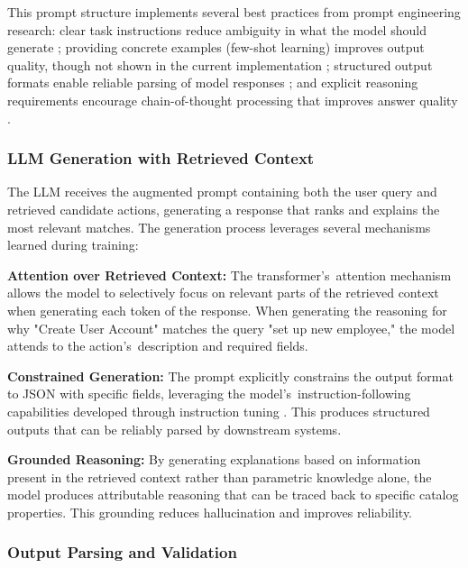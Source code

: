 This prompt structure implements several best practices from prompt engineering research: clear task instructions reduce ambiguity in what the model should generate \cite{brown2020languagemodelsfewshotlearners}; providing concrete examples (few-shot learning) improves output quality, though not shown in the current implementation \cite{brown2020languagemodelsfewshotlearners}; structured output formats enable reliable parsing of model responses \cite{kojima2023largelanguagemodelszeroshot}; and explicit reasoning requirements encourage chain-of-thought processing that improves answer quality \cite{wei2023chainofthoughtpromptingelicitsreasoning}.

\subsubsection{LLM Generation with Retrieved Context}

The LLM receives the augmented prompt containing both the user query and retrieved candidate actions, generating a response that ranks and explains the most relevant matches. The generation process leverages several mechanisms learned during training:

\textbf{Attention over Retrieved Context:} The transformer's~attention mechanism \cite{vaswani2023attentionneed} allows the model to selectively focus on relevant parts of the retrieved context when generating each token of the response. When generating the reasoning for why "Create User Account" matches the query "set up new employee," the model attends to the action's~description and required fields.

\textbf{Constrained Generation:} The prompt explicitly constrains the output format to JSON with specific fields, leveraging the model's~instruction-following capabilities developed through instruction tuning \cite{ouyang2022traininglanguagemodelsfollow}. This produces structured outputs that can be reliably parsed by downstream systems.

\textbf{Grounded Reasoning:} By generating explanations based on information present in the retrieved context rather than parametric knowledge alone, the model produces attributable reasoning that can be traced back to specific catalog properties. This grounding reduces hallucination and improves reliability.

\subsubsection{Output Parsing and Validation}

